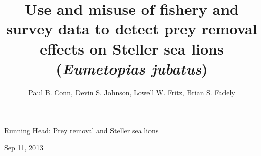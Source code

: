 \documentclass[nonumbib,leqno]{nrc1}
\begin{document}
\title{Use and misuse of fishery and survey data to detect prey removal effects on Steller sea lions ({\it Eumetopias jubatus})}

\author[P. B. Conn, D. S. Johnson, L. W. Fritz, B. S. Fadely]{Paul B. Conn, Devin S. Johnson, Lowell W. Fritz, Brian S. Fadely}
\address{National Marine Mammal Laboratory, Alaska Fisheries Science Center,
NOAA National Marine Fisheries Service,
Seattle, Washington, U.S.A. 98115}

\large


\maketitle

{\sc Running Head}: Prey removal and Steller sea lions \bigskip

Sep 11, 2013



\clearpage

\linenumbers

\end{document}
